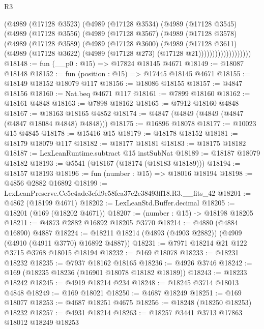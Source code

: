 \begin{lexlean}{R3}
\begin{coremodule}
                  (@4989
                    (@17128 @3523)
                    (@4989
                      (@17128 @3534)
                      (@4989
                        (@17128 @3545)
                        (@4989
                          (@17128 @3556)
                          (@4989
                            (@17128 @3567)
                            (@4989
                              (@17128 @3578)
                              (@4989
                                (@17128 @3589)
                                (@4989
                                  (@17128 @3600)
                                  (@4989
                                    (@17128 @3611)
                                    (@4989
                                      (@17128 @3622)
                                      (@4989 (@17128 @273) (@17128 @21)))))))))))))))))))
@18148 := fun (__p0 : @15) => @17824 @18145 @4671
@18149 := @18087 @18148
@18152 := fun (position : @15) => @17445 @18145 @4671
@18155 := @18149 @18152 @18079 @117
@18156 := @18086 @18155
@18157 := @4847 @18156
@18160 := Nat.beq @4671 @117
@18161 := @7899 @18160
@18162 := @18161 @4848
@18163 := @7898 @18162
@18165 := @7912 @18160 @4848
@18167 := @18163 @18165 @4852
@18174 := @4847 (@4849 (@4849 (@4847 (@4847 @18084 @4848) @4848)))
@18175 := @16896 @18078
@18177 := @10023 @15 @4845
@18178 := @15416 @15
@18179 := @18178 @18152
@18181 := @18179 @18079 @117
@18182 := @18177 @18181
@18183 := @18175 @18182
@18187 := LexLeanRuntime.subtract @15 instSubNat
@18189 := @18187 @18079 @18182
@18193 := @5541 (@18167 (@18174 (@18183 @18189)))
@18194 := @18157 @18193
@18196 := fun (number : @15) => @18016 @18194
@18198 := @4856 @2882 @16892
@18199 := LexLeanPreserve.Ce5c4adc3cfd9c58fca37e2c38493ff18.R3.__fits_42
@18201 := @4862 (@18199 @4671)
@18202 := LexLeanStd.Buffer.decimal
@18205 := @18201 (@169 (@18202 @4671))
@18207 := (number : @15) -> @18198 @18205
@18211 := @4873 @2882 @16892 @18205 @3770
@18214 := @4880 (@4884 @16890) @4887
@18224 := @18211 @18214 (@4893 (@4903 @2882)) (@4909 (@4910 (@4911 @3770) @16892 @4887))
@18231 := @7971 @18214 @21 @122 @3715 @3768 @18015 @18194
@18232 := @169 @18078
@18233 := @18231 @18232
@18235 := @7937 @18162 @18165
@18236 := @4926 @3746
@18242 := @169 (@18235 @18236 (@16901 @18078 @18182 @18189))
@18243 := @18233 @18242
@18245 := @4919 @18214 @234
@18248 := @18245 @3714 @18013 @4848
@18249 := @169 @18021
@18250 := @4687 @18249
@18251 := @169 @18077
@18253 := @4687 @18251 @4675
@18256 := @18248 (@18250 @18253) @18232
@18257 := @4931 @18214
@18263 := @18257 @3441 @3713 @17863 @18012 @18249 @18253

\end{coremodule}
\end{lexlean}
